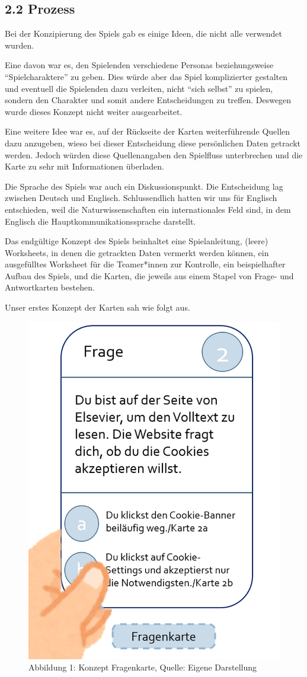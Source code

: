 \documentclass[a4paper,
fontsize=11pt,
oneside,
numbers=noperiodatend,
parskip=half-,
bibliography=totoc,
final
]{scrartcl}
\begin{document}
\subsection{2.2 Prozess}\label{prozess}

Bei der Konzipierung des Spiels gab es einige Ideen, die nicht alle
verwendet wurden.

Eine davon war es, den Spielenden verschiedene Personas beziehungsweise
\enquote{Spielcharaktere} zu geben. Dies würde aber das Spiel
komplizierter gestalten und eventuell die Spielenden dazu verleiten,
nicht \enquote{sich selbst} zu spielen, sondern den Charakter und somit
andere Entscheidungen zu treffen. Deswegen wurde dieses Konzept nicht
weiter ausgearbeitet.

Eine weitere Idee war es, auf der Rückseite der Karten weiterführende
Quellen dazu anzugeben, wieso bei dieser Entscheidung diese persönlichen
Daten getrackt werden. Jedoch würden diese Quellenangaben den Spielfluss
unterbrechen und die Karte zu sehr mit Informationen überladen.

Die Sprache des Spiels war auch ein Diskussionspunkt. Die Entscheidung
lag zwischen Deutsch und Englisch. Schlussendlich hatten wir uns für
Englisch entschieden, weil die Naturwissenschaften ein internationales
Feld sind, in dem Englisch die Hauptkommunikationssprache darstellt.

Das endgültige Konzept des Spiels beinhaltet eine Spielanleitung,
(leere) Worksheets, in denen die getrackten Daten vermerkt werden
können, ein ausgefülltes Worksheet für die Teamer*innen zur Kontrolle,
ein beispielhafter Aufbau des Spiels, und die Karten, die jeweils aus
einem Stapel von Frage- und Antwortkarten bestehen.

Unser erstes Konzept der Karten sah wie folgt aus.

\begin{figure}[H]
\centering
\includegraphics[width=.3\textwidth]{img/Abb1-Fragekarte.png}
\caption{Abbildung 1: Konzept Fragenkarte, Quelle: Eigene Darstellung}
\end{figure}
\end{document}
